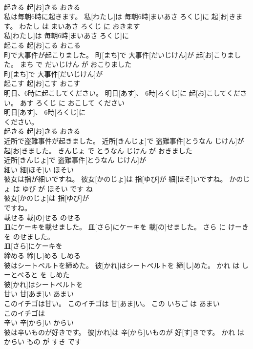 \documentclass[8pt]{extreport}
\begin{document}
\begin{CJK}{UTF8}{min}
\\	起きる	起[お]きる	おきる	
\\	私は毎朝6時に起きます。	私[わたし]は 毎朝6時[まいあさ ろくじ]に 起[お]きます。	わたし は まいあさ ろくじ に おきます	
\\	私[わたし]は 毎朝6時[まいあさ ろくじ]に
\\	起こる	起[お]こる	おこる	
\\	町で大事件が起こりました。	町[まち]で 大事件[だいじけん]が 起[お]こりました。	まち で だいじけん が おこりました	
\\	町[まち]で 大事件[だいじけん]が
\\	起こす	起[お]こす	おこす	
\\	明日、6時に起こしてください。	明日[あす]、 6時[ろくじ]に 起[お]こしてください。	あす ろくじ に おこして ください	
\\	明日[あす]、 6時[ろくじ]に
\\	ください。			
\\	起きる	起[お]きる	おきる	
\\	近所で盗難事件が起きました。	近所[きんじょ]で 盗難事件[とうなん じけん]が 起[お]きました。	きんじょ で とうなん じけん が おきました	
\\	近所[きんじょ]で 盗難事件[とうなん じけん]が
\\	細い	細[ほそ]い	ほそい	
\\	彼女は指が細いですね。	彼女[かのじょ]は 指[ゆび]が 細[ほそ]いですね。	かのじょ は ゆび が ほそい です ね	
\\	彼女[かのじょ]は 指[ゆび]が
\\	ですね。			
\\	載せる	載[の]せる	のせる	
\\	皿にケーキを載せました。	皿[さら]にケーキを 載[の]せました。	さら に けーき を のせました。	
\\	皿[さら]にケーキを
\\	締める	締[し]める	しめる	
\\	彼はシートベルトを締めた。	彼[かれ]はシートベルトを 締[し]めた。	かれ は しーとべると を しめた	
\\	彼[かれ]はシートベルトを
\\	甘い	甘[あま]い	あまい	
\\	このイチゴは甘い。	このイチゴは 甘[あま]い。	この いちご は あまい	
\\	このイチゴは
\\	辛い	辛[から]い	からい	
\\	彼は辛いものが好きです。	彼[かれ]は 辛[から]いものが 好[す]きです。	かれ は からい もの が すき です	

\end{CJK}
\end{document}
